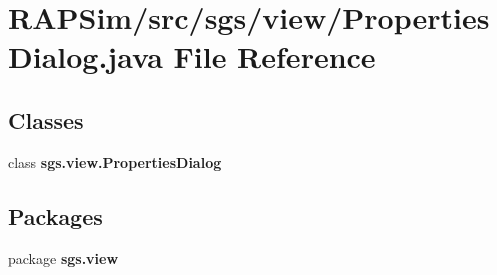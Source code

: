\section{R\-A\-P\-Sim/src/sgs/view/\-Properties\-Dialog.java File Reference}
\label{_properties_dialog_8java}
\subsection*{Classes}
\begin{DoxyCompactItemize}
\item 
class {\bf sgs.\-view.\-Properties\-Dialog}
\end{DoxyCompactItemize}
\subsection*{Packages}
\begin{DoxyCompactItemize}
\item 
package {\bf sgs.\-view}
\end{DoxyCompactItemize}
